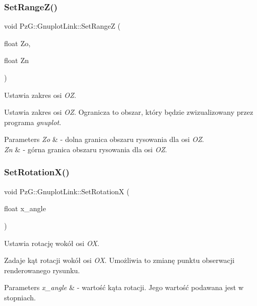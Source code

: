 \subsubsection{\texorpdfstring{Set\+Range\+Z()}{SetRangeZ()}}
{\footnotesize\ttfamily void Pz\+G\+::\+Gnuplot\+Link\+::\+Set\+RangeZ (\begin{DoxyParamCaption}\item[{float}]{Zo,  }\item[{float}]{Zn }\end{DoxyParamCaption})\hspace{0.3cm}{\ttfamily [inline]}}



Ustawia zakres osi {\itshape OZ}. 

Ustawia zakres osi {\itshape OZ}. Ogranicza to obszar, który będzie zwizualizowany przez programa {\itshape gnuplot}. 
\begin{DoxyParams}{Parameters}
{\em Zo} & -\/ dolna granica obszaru rysowania dla osi {\itshape OZ}. \\
\hline
{\em Zn} & -\/ górna granica obszaru rysowania dla osi {\itshape OZ}. \\
\hline
\end{DoxyParams}
\mbox{\label{class_pz_g_1_1_gnuplot_link_ace414a178fc745111344ce2390e363b7}} 
\subsubsection{\texorpdfstring{Set\+Rotation\+X()}{SetRotationX()}}
{\footnotesize\ttfamily void Pz\+G\+::\+Gnuplot\+Link\+::\+Set\+RotationX (\begin{DoxyParamCaption}\item[{float}]{x\+\_\+angle }\end{DoxyParamCaption})\hspace{0.3cm}{\ttfamily [inline]}}



Ustawia rotację wokół osi {\itshape OX}. 

Zadaje kąt rotacji wokół osi {\itshape OX}. Umożliwia to zmianę punktu obserwacji renderowanego rysunku. 
\begin{DoxyParams}{Parameters}
{\em x\+\_\+angle} & -\/ wartość kąta rotacji. Jego wartość podawana jest w stopniach. \\
\hline
\end{DoxyParams}
\mbox{\label{class_pz_g_1_1_gnuplot_link_ae1019984feb2a9cef9c8b41eec65ee97}} 
